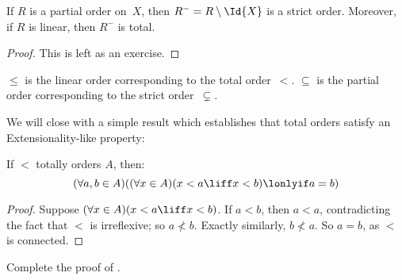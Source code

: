 \documentclass[../../../include/open-logic-section]{subfiles}
\begin{document}
 \begin{prop}
  	If $R$ is a partial order on~$X$, then $R^- = R
  	\setminus \Id{X}$ is a strict order. Moreover, if $R$ is linear, then $R^-$ is total.
  	\end{prop}
  \begin{proof}
  	This is left as an exercise.
\end{proof}
\begin{ex}
	$\le$ is the linear order corresponding to the total 
	order~$<$. $\subseteq$ is the partial order corresponding to
	the strict order~$\subsetneq$.
\end{ex}
\noindent
We will close with a simple result which establishes that total orders satisfy an Extensionality-like property:
\begin{prop}
	If $<$ totally orders $A$, then: 
	$$(\forall a, b \in A)((\forall x \in A)(x < a \liff x < b) \lonlyif a = b)$$
\end{prop}
\begin{proof}
	Suppose $(\forall x \in A)(x < a \liff x < b)$. If $a < b$, then $a < a$, contradicting the fact that $<$ is irreflexive; so $a \nless b$. Exactly similarly, $b \nless a$. So $a = b$, as $<$ is connected.
\end{proof}\noindent
\begin{prob}
  Complete the proof of . 
\end{prob}
\end{document}
